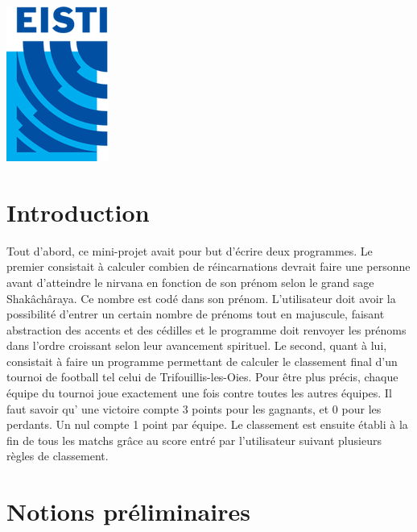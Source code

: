 \documentclass[13pt]{article}
\begin{document}
\begin{titlepage}
\includegraphics{Logo_EISTI.png}\\[1cm] %
 

\vfill %

\end{titlepage}

\tableofcontents
\newpage

\section{Introduction}

Tout d'abord, ce mini-projet avait pour but d'écrire deux programmes.
Le premier consistait à calculer combien de réincarnations devrait faire une personne avant d'atteindre le nirvana en fonction de son prénom selon le grand sage Shakâchâraya. Ce nombre est codé dans son prénom. L'utilisateur doit avoir la possibilité d'entrer un certain nombre de prénoms tout en majuscule, faisant abstraction des accents et des cédilles   et le programme doit renvoyer les prénoms dans l'ordre croissant selon leur avancement spirituel.
Le second, quant à lui, consistait à faire un programme permettant de calculer le classement final d'un tournoi de football tel celui de Trifouillis-les-Oies. Pour être plus précis, chaque équipe du tournoi joue exactement une fois contre toutes les autres équipes. Il faut savoir qu’ une victoire compte 3 points pour les gagnants, et 0 pour les perdants. Un nul compte 1 point par équipe. Le classement est ensuite établi à la fin de tous les matchs grâce au score entré par l'utilisateur suivant plusieurs règles de classement.

\section{Notions préliminaires}
\end{document}
